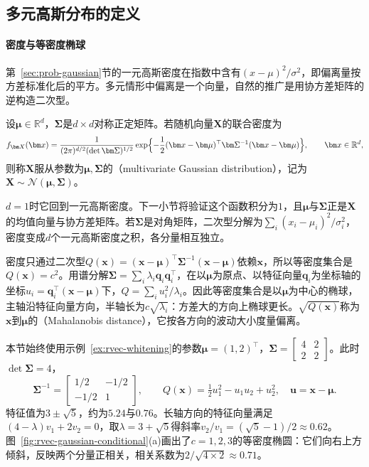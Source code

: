 \subsection{多元高斯分布的定义}

\paragraph{密度与等密度椭球}
第~\ref{sec:prob-gaussian}节的一元高斯密度在指数中含有$(x-\mu)^2/\sigma^2$，即偏离量按方差标准化后的平方。多元情形中偏离是一个向量，自然的推广是用协方差矩阵的逆构造二次型。

\begin{definition}[多元高斯分布]
设$\bm\mu\in\mathbb R^d$，$\bm\Sigma$是$d\times d$对称正定矩阵。若随机向量$\bm X$的联合密度为
\begin{equation}
 f_{\bm X}(\bm x)=\frac1{(2\pi)^{d/2}(\det\bm\Sigma)^{1/2}}
 \exp\Bigl\{-\frac12(\bm x-\bm\mu)^{\top}\bm\Sigma^{-1}(\bm x-\bm\mu)\Bigr\},\qquad\bm x\in\mathbb R^d,
 \label{eq:rvec-gaussian-density}
\end{equation}
则称$\bm X$服从参数为$\bm\mu,\bm\Sigma$的（multivariate Gaussian distribution），记为$\bm X\sim\mathcal N(\bm\mu,\bm\Sigma)$。
\end{definition}

$d=1$时它回到一元高斯密度。下一小节将验证这个函数积分为$1$，且$\bm\mu$与$\bm\Sigma$正是$\bm X$的均值向量与协方差矩阵。若$\bm\Sigma$是对角矩阵，二次型分解为$\sum_i(x_i-\mu_i)^2/\sigma_i^2$，密度变成$d$个一元高斯密度之积，各分量相互独立。

密度只通过二次型$Q(\bm x)=(\bm x-\bm\mu)^{\top}\bm\Sigma^{-1}(\bm x-\bm\mu)$依赖$\bm x$，所以等密度集合是$Q(\bm x)=c^2$。用谱分解$\bm\Sigma=\sum_i\lambda_i\bm q_i\bm q_i^{\top}$，在以$\bm\mu$为原点、以特征向量$\bm q_i$为坐标轴的坐标$u_i=\bm q_i^{\top}(\bm x-\bm\mu)$下，$Q=\sum_iu_i^2/\lambda_i$。因此等密度集合是以$\bm\mu$为中心的椭球，主轴沿特征向量方向，半轴长为$c\sqrt{\lambda_i}$：方差大的方向上椭球更长。$\sqrt{Q(\bm x)}$称为$\bm x$到$\bm\mu$的（Mahalanobis distance），它按各方向的波动大小度量偏离。

\begin{example}[一个二维高斯分布]
\label{ex:rvec-gaussian-2d}
本节始终使用示例~\ref{ex:rvec-whitening}的参数$\bm\mu=(1,2)^{\top}$，$\bm\Sigma=\begin{bmatrix}4&2\\2&2\end{bmatrix}$。此时$\det\bm\Sigma=4$，
\[
 \bm\Sigma^{-1}=\begin{bmatrix}1/2&-1/2\\-1/2&1\end{bmatrix},\qquad
 Q(\bm x)=\tfrac12u_1^2-u_1u_2+u_2^2,\quad \bm u=\bm x-\bm\mu .
\]
特征值为$3\pm\sqrt5$，约为$5.24$与$0.76$。长轴方向的特征向量满足$(4-\lambda)v_1+2v_2=0$，取$\lambda=3+\sqrt5$得斜率$v_2/v_1=(\sqrt5-1)/2\approx0.62$。图~\ref{fig:rvec-gaussian-conditional}(a)画出了$c=1,2,3$的等密度椭圆：它们向右上方倾斜，反映两个分量正相关，相关系数为$2/\sqrt{4\times2}\approx0.71$。
\end{example}

